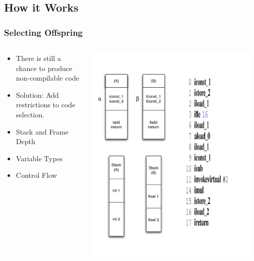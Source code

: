 \documentclass{beamer}
\begin{document}
\subsection[How it works]{How it Works}
\begin{frame}
  \frametitle{Selecting Offspring}
  
  \begin{columns}
  \begin{column}{0.6\textwidth}
  \begin{itemize}
  	\item There is still a chance to produce non-compilable code
	\item Solution: Add restrictions to code selection.
	\item Stack and Frame Depth
	\item Variable Types
	\item Control Flow
  \end{itemize}
  \end{column}
  \begin{column}{0.4\textwidth}
	  \includegraphics[width=0.95\textwidth]{talk.pdf}
  \end{column}
	  
  
  \end{columns}
\end{frame}
\end{document}
